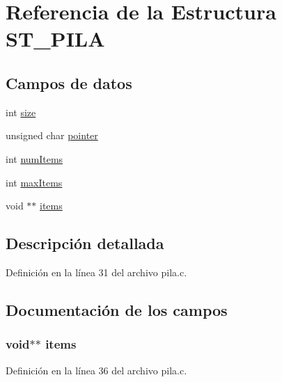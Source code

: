 \hypertarget{struct_s_t___p_i_l_a}{}\section{Referencia de la Estructura S\+T\+\_\+\+P\+I\+L\+A}
\label{struct_s_t___p_i_l_a}
\subsection*{Campos de datos}
\begin{DoxyCompactItemize}
\item 
int \hyperlink{struct_s_t___p_i_l_a_a439227feff9d7f55384e8780cfc2eb82}{size}
\item 
unsigned char \hyperlink{struct_s_t___p_i_l_a_ab0785544ba66016a8ee8f818ea08b1c2}{pointer}
\item 
int \hyperlink{struct_s_t___p_i_l_a_a1411ea3b26a34297217f0225315d9758}{num\+Items}
\item 
int \hyperlink{struct_s_t___p_i_l_a_ab042caa09e8430028d87252ad6646a52}{max\+Items}
\item 
void $\ast$$\ast$ \hyperlink{struct_s_t___p_i_l_a_a94977134c19c2c536550e6b13d69218d}{items}
\end{DoxyCompactItemize}


\subsection{Descripción detallada}


Definición en la línea 31 del archivo pila.\+c.



\subsection{Documentación de los campos}
\hypertarget{struct_s_t___p_i_l_a_a94977134c19c2c536550e6b13d69218d}{}
\subsubsection[{items}]{\setlength{\rightskip}{0pt plus 5cm}void$\ast$$\ast$ items}\label{struct_s_t___p_i_l_a_a94977134c19c2c536550e6b13d69218d}


Definición en la línea 36 del archivo pila.\+c.

\hypertarget{struct_s_t___p_i_l_a_ab042caa09e8430028d87252ad6646a52}{}
